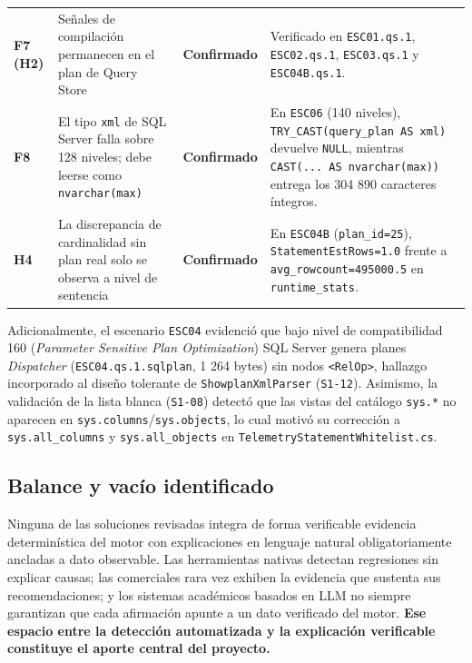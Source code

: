 \documentclass[12pt,a4paper]{article}
\begin{document}
\begin{longtable}{>{\bfseries}p{} p{} p{} p{}}
F7 (H2) & Señales de compilación permanecen en el plan de Query Store & \textbf{Confirmado} & Verificado en \texttt{ESC01.qs.1}, \texttt{ESC02.qs.1}, \texttt{ESC03.qs.1} y \texttt{ESC04B.qs.1}. \\
F8 & El tipo \texttt{xml} de SQL Server falla sobre 128 niveles; debe leerse como \texttt{nvarchar(max)} & \textbf{Confirmado} & En \texttt{ESC06} (140 niveles), \texttt{TRY\_CAST(query\_plan AS xml)} devuelve \texttt{NULL}, mientras \texttt{CAST(... AS nvarchar(max))} entrega los 304 890 caracteres íntegros. \\
H4 & La discrepancia de cardinalidad sin plan real solo se observa a nivel de sentencia & \textbf{Confirmado} & En \texttt{ESC04B} (\texttt{plan\_id=25}), \texttt{StatementEstRows=1.0} frente a \texttt{avg\_rowcount=495000.5} en \texttt{runtime\_stats}. \\
\end{longtable}
\endgroup

Adicionalmente, el escenario \texttt{ESC04} evidenció que bajo nivel de compatibilidad 160 (\textit{Parameter Sensitive Plan Optimization}) SQL Server genera planes \textit{Dispatcher} (\texttt{ESC04.qs.1.sqlplan}, 1 264 bytes) sin nodos \texttt{<RelOp>}, hallazgo incorporado al diseño tolerante de \texttt{ShowplanXmlParser} (\texttt{S1-12}). Asimismo, la validación de la lista blanca (\texttt{S1-08}) detectó que las vistas del catálogo \texttt{sys.*} no aparecen en \texttt{sys.columns}/\texttt{sys.objects}, lo cual motivó su corrección a \texttt{sys.all\_columns} y \texttt{sys.all\_objects} en \texttt{TelemetryStatementWhitelist.cs}.

\subsection{Balance y vacío identificado}

Ninguna de las soluciones revisadas integra de forma verificable evidencia determinística del motor con explicaciones en lenguaje natural obligatoriamente ancladas a dato observable. Las herramientas nativas detectan regresiones sin explicar causas; las comerciales rara vez exhiben la evidencia que sustenta sus recomendaciones; y los sistemas académicos basados en LLM no siempre garantizan que cada afirmación apunte a un dato verificado del motor. \textbf{Ese espacio entre la detección automatizada y la explicación verificable constituye el aporte central del proyecto.}

\end{document}

